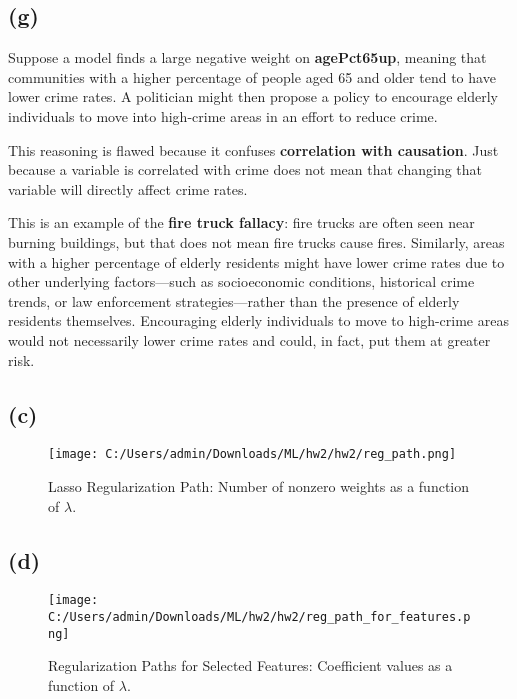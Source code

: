 \documentclass{article}
\begin{document}
\subsection*{(g)}

Suppose a model finds a large negative weight on \textbf{agePct65up}, meaning that communities with a higher percentage of people aged 65 and older tend to have lower crime rates. A politician might then propose a policy to encourage elderly individuals to move into high-crime areas in an effort to reduce crime.

\noindent This reasoning is flawed because it confuses \textbf{correlation with causation}. Just because a variable is correlated with crime does not mean that changing that variable will directly affect crime rates.

\noindent This is an example of the \textbf{fire truck fallacy}: fire trucks are often seen near burning buildings, but that does not mean fire trucks cause fires. Similarly, areas with a higher percentage of elderly residents might have lower crime rates due to other underlying factors—such as socioeconomic conditions, historical crime trends, or law enforcement strategies—rather than the presence of elderly residents themselves. Encouraging elderly individuals to move to high-crime areas would not necessarily lower crime rates and could, in fact, put them at greater risk.

\newpage
\subsection*{(c)}

\begin{figure}[h]
    \centering
    \texttt{[image: C:/Users/admin/Downloads/ML/hw2/hw2/reg\_path.png]}
    \caption{Lasso Regularization Path: Number of nonzero weights as a function of $\lambda$.}
    \label{fig:lasso-path}
\end{figure}

\newpage
\subsection*{(d)}

\begin{figure}[h]
    \centering
    \texttt{[image: C:/Users/admin/Downloads/ML/hw2/hw2/reg\_path\_for\_features.png]}
    \caption{Regularization Paths for Selected Features: Coefficient values as a function of $\lambda$.}
    \label{fig:feature-paths}
\end{figure}
\end{document}

